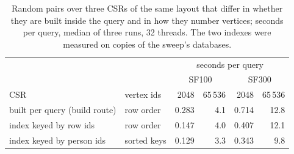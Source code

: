 \begin{table}[t]\centering\scriptsize\setlength{\tabcolsep}{3pt}
\caption{Random pairs over three CSRs of the same layout that differ in whether they are built inside the query and in how they number vertices; seconds per query, median of three runs, 32 threads. The two indexes were measured on copies of the sweep's databases.}\label{tab:numbering}
\begin{tabular}{llrrrr}\toprule
 & & \multicolumn{4}{c}{seconds per query} \\
 & & \multicolumn{2}{c}{SF100} & \multicolumn{2}{c}{SF300} \\
CSR & vertex ids & 2048 & 65\,536 & 2048 & 65\,536 \\ \midrule
built per query (build route) & row order & 0.283 & 4.1 & 0.714 & 12.8 \\
index keyed by row ids & row order & 0.147 & 4.0 & 0.407 & 12.1 \\
index keyed by person ids & sorted keys & 0.129 & 3.3 & 0.343 & 9.8 \\
\bottomrule\end{tabular}\end{table}

